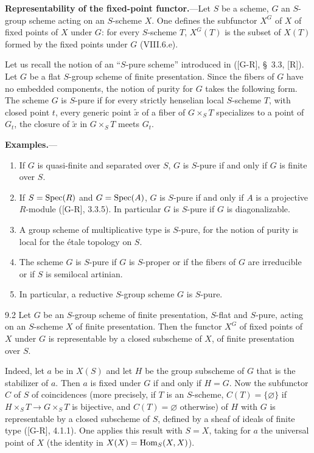 \textbf{Representability of the fixed-point functor.}---Let $S$ be a scheme, $G$ an $S$-group scheme acting on an $S$-scheme $X$. One defines the subfunctor $X^G$ of $X$ of fixed points of $X$ under $G$: for every $S$-scheme $T$, $X^G(T)$ is the subset of $X(T)$ formed by the fixed points under $G$ (VIII.6.e).

Let us recall the notion of an ``$S$-pure scheme'' introduced in ([G-R], §~3.3, [R]). Let $G$ be a flat $S$-group scheme of finite presentation. Since the fibers of $G$ have no embedded components, the notion of purity for $G$ takes the following form. The scheme $G$ is $S$-pure if for every strictly henselian local $S$-scheme $T$, with closed point $t$, every generic point $\widetilde x$ of a fiber of $G\times_S T$ specializes to a point of $G_t$, \ie the closure of $\widetilde x$ in $G\times_S T$ meets $G_t$.

\par\medskip\noindent\textbf{Examples.}---
\begin{enumerate}[label=(\arabic*)]
\item If $G$ is quasi-finite and separated over $S$, $G$ is $S$-pure if and only if $G$ is finite over $S$.
\item If $S=\operatorname{Spec}(R)$ and $G=\operatorname{Spec}(A)$, $G$ is $S$-pure if and only if $A$ is a projective $R$-module ([G-R], 3.3.5). In particular $G$ is $S$-pure if $G$ is diagonalizable.
\item A group scheme of multiplicative type is $S$-pure, for the notion of purity is local for the étale topology on $S$.
\item The scheme $G$ is $S$-pure if $G$ is $S$-proper or if the fibers of $G$ are irreducible or if $S$ is semilocal artinian.
\item In particular, a reductive $S$-group scheme $G$ is $S$-pure.
\end{enumerate}
\begin{proposition}{9.2}\label{XII.9.2}
Let $G$ be an $S$-group scheme of finite presentation, $S$-flat and $S$-pure, acting on an $S$-scheme $X$ of finite presentation. Then the functor $X^G$ of fixed points of $X$ under $G$ is representable by a closed subscheme of $X$, of finite presentation over $S$.
\end{proposition}
Indeed, let $a$ be in $X(S)$ and let $H$ be the group subscheme of $G$ that is the stabilizer of $a$. Then $a$ is fixed under $G$ if and only if $H=G$. Now the subfunctor $C$ of $S$ of coincidences (more precisely, if $T$ is an $S$-scheme, $C(T)=\{\varnothing\}$ if $H\times_S T\to G\times_S T$ is bijective, and $C(T)=\varnothing$ otherwise) of $H$ with $G$ is representable by a closed subscheme of $S$, defined by a sheaf of ideals of finite type ([G-R], 4.1.1). One applies this result with $S=X$, taking for $a$ the universal point of $X$ (\ie the identity in $X(X)=\operatorname{Hom}_S(X,X)$).

